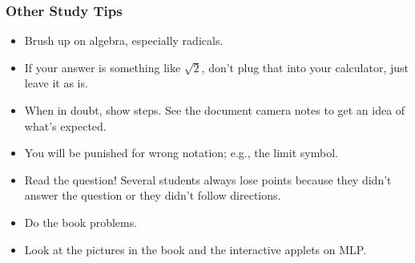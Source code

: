 \documentclass[14pt]{beamer}
\begin{document}
\begin{frame}
\frametitle{Other Study Tips}
\footnotesize
\begin{itemize}
\item Brush up on algebra, especially radicals.
\item If your answer is something like $\sqrt 2$, don't plug that into your calculator, just leave it as is.
\item When in doubt, show steps.  See the document camera notes to get an idea of what's expected.
\item You will be punished for wrong notation; e.g., the limit symbol.
\item Read the question!  Several students always lose points because they didn't answer the question or they didn't follow directions.
\item Do the book problems.
\item Look at the pictures in the book and the interactive applets on MLP.
\end{itemize}
\end{frame}


\begin{comment}
\end{comment}
\end{document}
